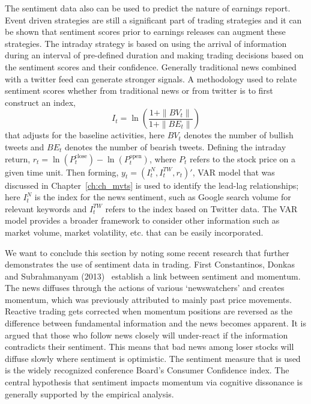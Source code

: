 The sentiment data also can be used to predict the nature of earnings report. Event driven strategies are still a significant part of trading strategies and it can be shown that sentiment scores prior to earnings releases can augment these strategies. The intraday strategy is based on using the arrival of information during an interval of pre-defined duration and making trading decisions based on the sentiment scores and their confidence. Generally traditional news combined with a twitter feed can generate stronger signals. A methodology used to relate sentiment scores whether from traditional news or from twitter is to first construct an index, 
	\begin{equation}\label{eqn:itwithln}
	I_t= \ln\left( \dfrac{1+\| BV_t \|}{1+\| BE_t \|}\right)
	\end{equation}  
that adjusts for the baseline activities, here $BV_t$ denotes the number of bullish tweets and $BE_t$ denotes the number of bearish tweets. Defining the intraday return, $r_t= \ln(P_t^{\text{close}}) - \ln(P_t^{\text{open}})$, where $P_t$ refers to the stock price on a given time unit. Then forming, $y_t=(I_t^N,I_t^{TW},r_t)'$, VAR model that was discussed in Chapter~\ref{ch:ch_mvts} is used to identify the lead-lag relationships; here $I_t^N$ is the index for the news sentiment, such as Google search volume for relevant keywords and $I_t^{TW}$ refers to the index based on Twitter data. The VAR model provides a broader framework to consider other information such as market volume, market volatility, etc. that can be easily incorporated. \twomedskip




We want to conclude this section by noting some recent research that further demonstrates the use of sentiment data in trading. First Constantinos, Donkas and Subrahmanyam (2013)~\cite{contdonksub13} establish a link between sentiment and momentum. The news diffuses through the actions of various `newswatchers' and creates momentum, which was previously attributed to mainly past price movements. Reactive trading gets corrected when momentum positions are reversed as the difference between fundamental information and the news becomes apparent. It is argued that those who follow news closely will under-react if the information contradicts their sentiment. This means that bad news among loser stocks will diffuse slowly where sentiment is optimistic. The sentiment measure that is used is the widely recognized conference Board's Consumer Confidence index. The central hypothesis that sentiment impacts momentum via cognitive dissonance is generally supported by the empirical analysis.


